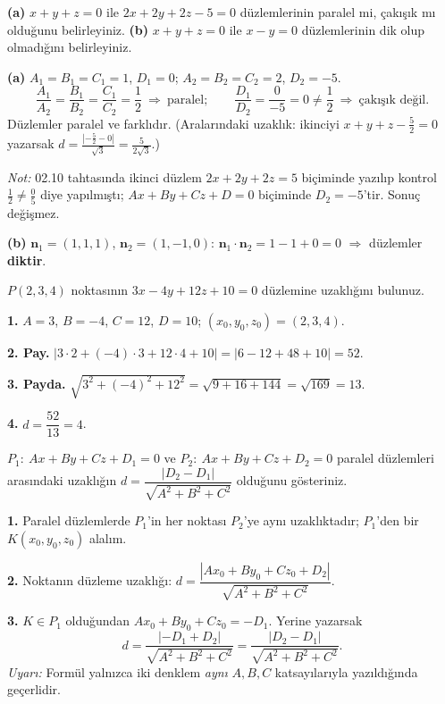 \begin{soru}
\textbf{(a)} $x+y+z=0$ ile $2x+2y+2z-5=0$ düzlemlerinin paralel mi, çakışık mı olduğunu belirleyiniz.
\textbf{(b)} $x+y+z=0$ ile $x-y=0$ düzlemlerinin dik olup olmadığını belirleyiniz.
\end{soru}
\begin{cevap}
\textbf{(a)} $A_1=B_1=C_1=1$, $D_1=0$; $A_2=B_2=C_2=2$, $D_2=-5$.
\[ \frac{A_1}{A_2}=\frac{B_1}{B_2}=\frac{C_1}{C_2}=\frac12\ \Rightarrow\ \text{paralel};\qquad \frac{D_1}{D_2}=\frac{0}{-5}=0\neq\frac12\ \Rightarrow\ \text{çakışık değil.} \]
Düzlemler paralel ve farklıdır. (Aralarındaki uzaklık: ikinciyi $x+y+z-\frac52=0$ yazarsak $d=\frac{|{-\frac52}-0|}{\sqrt3}=\frac{5}{2\sqrt3}$.)

\textit{Not:} 02.10 tahtasında ikinci düzlem $2x+2y+2z=5$ biçiminde yazılıp kontrol $\frac12\neq\frac05$ diye yapılmıştı; $Ax+By+Cz+D=0$ biçiminde $D_2=-5$'tir. Sonuç değişmez.

\textbf{(b)} $\mathbf n_1=(1,1,1)$, $\mathbf n_2=(1,-1,0)$: $\mathbf n_1\cdot\mathbf n_2=1-1+0=0$ $\Rightarrow$ düzlemler \textbf{diktir}.
\end{cevap}

\begin{soru}
$P(2,3,4)$ noktasının $3x-4y+12z+10=0$ düzlemine uzaklığını bulunuz.
\end{soru}
\begin{cevap}
\textbf{1.} $A=3$, $B=-4$, $C=12$, $D=10$; $(x_0,y_0,z_0)=(2,3,4)$.

\textbf{2. Pay.} $|3\cdot2+(-4)\cdot3+12\cdot4+10|=|6-12+48+10|=52$.

\textbf{3. Payda.} $\sqrt{3^2+(-4)^2+12^2}=\sqrt{9+16+144}=\sqrt{169}=13$.

\textbf{4.} $d=\dfrac{52}{13}=\boxed{4}$.
\end{cevap}

\begin{soru}
$P_1:\ Ax+By+Cz+D_1=0$ ve $P_2:\ Ax+By+Cz+D_2=0$ paralel düzlemleri arasındaki uzaklığın $d=\dfrac{|D_2-D_1|}{\sqrt{A^2+B^2+C^2}}$ olduğunu gösteriniz.
\end{soru}
\begin{cevap}
\textbf{1.} Paralel düzlemlerde $P_1$'in her noktası $P_2$'ye aynı uzaklıktadır; $P_1$'den bir $K(x_0,y_0,z_0)$ alalım.

\textbf{2.} Noktanın düzleme uzaklığı: $d=\dfrac{|Ax_0+By_0+Cz_0+D_2|}{\sqrt{A^2+B^2+C^2}}$.

\textbf{3.} $K\in P_1$ olduğundan $Ax_0+By_0+Cz_0=-D_1$. Yerine yazarsak
\[ d=\frac{|-D_1+D_2|}{\sqrt{A^2+B^2+C^2}}=\frac{|D_2-D_1|}{\sqrt{A^2+B^2+C^2}} . \]
\textit{Uyarı:} Formül yalnızca iki denklem \emph{aynı} $A,B,C$ katsayılarıyla yazıldığında geçerlidir.
\end{cevap}


